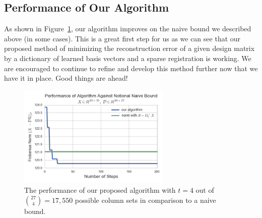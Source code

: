 \documentclass{article}
\begin{document}
\subsection{Performance of Our Algorithm}

As shown in Figure~\ref{fig:ouralg}, our algorithm improves on the naive bound we described above (in some cases). This is a great first step for us as we can see that our proposed method of minimizing the reconstruction error of a given design matrix by a dictionary of learned basis vectors and a sparse registration is working. We are encouraged to continue to refine and develop this method further now that we have it in place. Good things are ahead!

\begin{figure}[ht!]
\centering
\includegraphics[width=0.65\textwidth]{src/our_alg.png}
\caption{The performance of our proposed algorithm with $t=4$ out of $\binom{27}{4} =17,550$ possible column sets in comparison to a naive bound. }
\label{fig:ouralg}
\end{figure}



\end{document}
